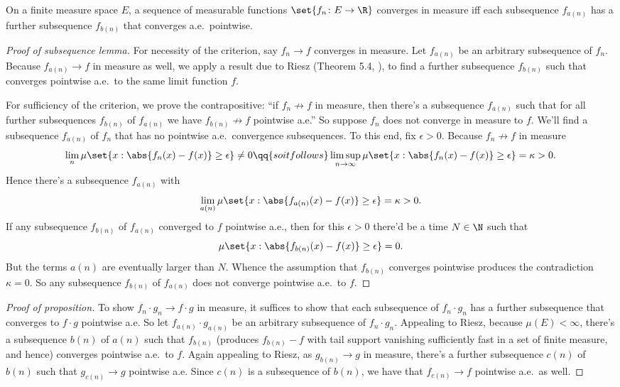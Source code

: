 \documentclass[onesided]{ccg-pset}
\begin{document}
\begin{enumerate}
\begin{lem*}
    On a finite measure space $E$, a sequence of measurable functions $\set{f_n \colon E \to \R}$ converges in measure iff each subsequence $f_{a(n)}$ has a further subsequence $f_{b(n)}$ that converges a.e.~pointwise.
\end{lem*}

\begin{proof}[Proof of subsequence lemma]
For necessity of the criterion, say $f_n \to f$ converges in measure. Let $f_{a(n)}$ be an arbitrary subsequence of $f_{n}$. Because $f_{a(n)} \to f$ in measure as well, we apply a result due to Riesz (Theorem 5.4, \cite{RF10}), to find a further subsequence $f_{b(n)}$ such that converges pointwise a.e.~to the same limit function $f$.

For sufficiency of the criterion, we prove the contrapositive: ``if $f_n \not\to f$ in measure, then there's a subsequence $f_{a(n)}$ such that for all further subsequences $f_{b(n)}$ of $f_{a(n)}$ we have $f_{b(n)} \not\to f$ pointwise a.e.''  So suppose $f_n$ does not converge in measure to $f$. We'll find a subsequence $f_{a(n)}$ of $f_n$ that has no pointwise a.e.~convergence subsequences. To this end, fix $\epsilon > 0$. Because $f_n \not\to f$ in measure
\begin{equation*}
    \lim_n \mu \set{x: \abs{f_n(x) - f(x)} \ge \epsilon} \neq 0 \qq{so it follows}
    \limsup_{n \to \infty} \mu \set{x: \abs{f_n(x) - f(x)} \ge \epsilon} = \kappa > 0.
\end{equation*}
Hence there's a subsequence $f_{a(n)}$ with 
\begin{equation*}
    \lim_{a(n)} \mu \set{x: \abs{f_{a(n)}(x) - f(x)} \ge \epsilon}  = \kappa > 0.
\end{equation*}
If any subsequence $f_{b(n)}$ of $f_{a(n)}$ converged to $f$ pointwise a.e., then for this $\epsilon > 0$ there'd be a time $N \in \N$ such that
\begin{equation*}
    \mu \set{x: \abs{f_{b(n)}(x) - f(x)} \ge \epsilon} = 0.
\end{equation*}
But the terms $a(n)$ are eventually larger than $N$. Whence the assumption that $f_{b(n)}$ converges pointwise produces the contradiction $\kappa = 0$. So any subsequence $f_{b(n)}$ of $f_{a(n)}$ does not converge pointwise a.e.~to $f$.
\end{proof}

\begin{proof}[Proof of proposition]
To show $f_n \cdot g_n \to f\cdot g$ in measure, it suffices to show that each subsequence of $f_n \cdot g_n$ has a further subsequence that converges to $f \cdot g$ pointwise a.e. So let $f_{a(n)} \cdot g_{a(n)}$ be an arbitrary subsequence of $f_n \cdot g_n$. Appealing to Riesz, because $\mu(E) < \infty$, there's a subsequence $b(n)$ of $a(n)$ such that $f_{b(n)}$ (produces $f_{b(n)} - f$ with tail support vanishing sufficiently fast in a set of finite measure, and hence) converges pointwise a.e.~to $f$. Again appealing to Riesz, as $g_{b(n)} \to g$ in measure, there's a further subsequence $c(n)$ of $b(n)$ such that $g_{c(n)} \to g$ pointwise a.e. Since $c(n)$ is a subsequence of $b(n)$, we have that $f_{c(n)} \to f$ pointwise a.e.~as well. 


\end{proof}
\end{enumerate}
\end{document}
